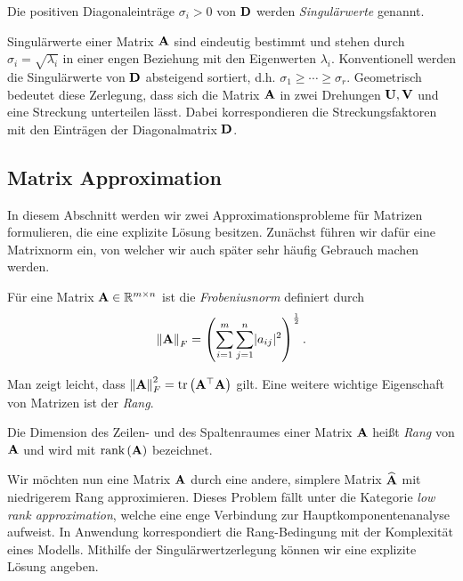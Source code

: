 \begin{defn}[Singulärwert]
Die positiven Diagonaleinträge $\sigma_{i} > 0$ von $\mathbf{D}$ werden \textit{Singulärwerte} genannt.
\end{defn}

Singulärwerte einer Matrix $\mathbf{A}$ sind eindeutig bestimmt und stehen durch $\sigma_i = \sqrt{\lambda_i}$ in einer engen Beziehung mit den Eigenwerten $\lambda_i$. Konventionell werden die Singulärwerte von $\mathbf{D}$ absteigend sortiert, d.h. $\sigma _{1} \geq \cdots \geq \sigma _{r}$. Geometrisch bedeutet diese Zerlegung, dass sich die Matrix $\mathbf{A}$ in zwei Drehungen $\mathbf{U}, \mathbf{V}$ und eine Streckung unterteilen lässt. Dabei korrespondieren die Streckungsfaktoren mit den Einträgen der Diagonalmatrix $\mathbf{D}$.


\subsection{Matrix Approximation}
\label{matrix_approximation}

In diesem Abschnitt werden wir zwei Approximationsprobleme für Matrizen formulieren, die eine explizite Lösung besitzen. Zunächst führen wir dafür eine Matrixnorm ein, von welcher wir auch später sehr häufig Gebrauch machen werden.

\begin{defn}
Für eine Matrix $\mathbf{A} \in \mathbb{R}^{m \times n}$ ist die \textit{Frobeniusnorm} definiert durch
$$\left\lVert \mathbf{A} \right\rVert_F = \left( \sum_{i=1}^{m} \sum_{j=1}^{n} \lvert a_{ij} \rvert ^{2} \right) ^{\frac{1}{2}}.$$
\end{defn}

Man zeigt leicht, dass $\left\lVert \mathbf{A} \right\rVert_F^2 = \text{tr} \left( \mathbf{A}^{\top} \mathbf{A} \right)$ gilt.
Eine weitere wichtige Eigenschaft von Matrizen ist der \textit{Rang}.

\begin{defn}
Die Dimension des Zeilen- und des Spaltenraumes einer Matrix $\mathbf{A}$ heißt \textit{Rang} von $\mathbf{A}$ und wird mit $\text{rank} \left( \mathbf{A} \right)$ bezeichnet.
\end{defn}

Wir möchten nun eine Matrix $\mathbf{A}$ durch eine andere, simplere Matrix $\widehat{\mathbf{A}}$ mit niedrigerem Rang approximieren. Dieses Problem fällt unter die Kategorie \textit{low rank approximation}, welche eine enge Verbindung zur Hauptkomponentenanalyse aufweist. In Anwendung korrespondiert die Rang-Bedingung mit der Komplexität eines Modells. Mithilfe der Singulärwertzerlegung können wir eine explizite Lösung angeben.

